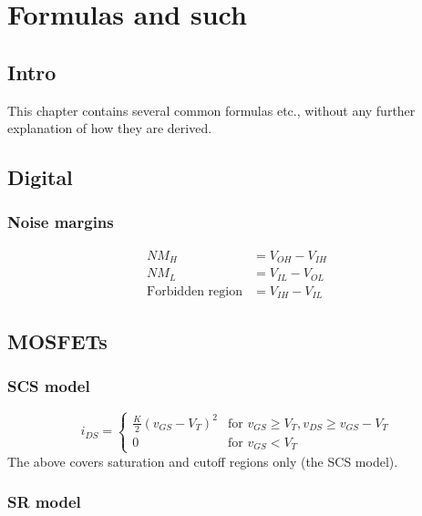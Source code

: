 \documentclass[12pt,a4paper]{report}
\begin{document}
\maketitle

\tableofcontents


\chapter{Formulas and such}

\section{Intro}

This chapter contains several common formulas etc., without any further explanation of how they are derived.

\section{Digital}

\subsection{Noise margins}
\begin{align*}
  NM_H &= V_{OH} - V_{IH}\\
  NM_L &= V_{IL} - V_{OL}\\
\text{Forbidden region} &= V_{IH} - V_{IL}
\end{align*}

\section{MOSFETs}

\subsection{SCS model}
\[ 
 i_{DS} = \begin{cases}
   \frac{K}{2}(v_{GS} - V_T)^2 & \text{for $v_{GS} \ge V_T, v_{DS} \ge v_{GS} - V_T$} \\
   0 & \text{for $v_{GS} < V_T$}
 \end{cases}
\]
The above covers saturation and cutoff regions only (the SCS model).

\subsection{SR model}
\end{document}
